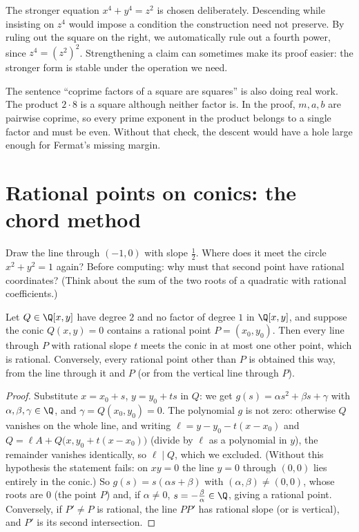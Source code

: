 The stronger equation $x^4+y^4=z^2$ is chosen deliberately. Descending while insisting on $z^4$ would impose a condition the construction need not preserve. By ruling out the square on the right, we automatically rule out a fourth power, since $z^4=(z^2)^2$. Strengthening a claim can sometimes make its proof easier: the stronger form is stable under the operation we need.

The sentence ``coprime factors of a square are squares'' is also doing real work. The product $2\cdot8$ is a square although neither factor is. In the proof, $m,a,b$ are pairwise coprime, so every prime exponent in the product belongs to a single factor and must be even. Without that check, the descent would have a hole large enough for Fermat's missing margin.

\section{Rational points on conics: the chord method}

\begin{think}
Draw the line through $(-1,0)$ with slope $\frac12$. Where does it meet the circle $x^2+y^2=1$ again? Before computing: why must that second point have rational coordinates? (Think about the sum of the two roots of a quadratic with rational coefficients.)
\end{think}

\begin{proposition}\label{prop:chord}
Let $Q\in\Q[x,y]$ have degree $2$ and no factor of degree $1$ in $\Q[x,y]$, and suppose the conic $Q(x,y)=0$ contains a rational point $P=(x_0,y_0)$. Then every line through $P$ with rational slope $t$ meets the conic in at most one other point, which is rational. Conversely, every rational point other than $P$ is obtained this way, from the line through it and $P$ (or from the vertical line through $P$).
\end{proposition}
\begin{proof}
Substitute $x=x_0+s$, $y=y_0+ts$ in $Q$: we get $g(s)=\alpha s^2+\beta s+\gamma$ with $\alpha,\beta,\gamma\in\Q$, and $\gamma=Q(x_0,y_0)=0$. The polynomial $g$ is not zero: otherwise $Q$ vanishes on the whole line, and writing $\ell=y-y_0-t(x-x_0)$ and $Q=\ell A+Q\big(x,y_0+t(x-x_0)\big)$ (divide by $\ell$ as a polynomial in $y$), the remainder vanishes identically, so $\ell\mid Q$, which we excluded. (Without this hypothesis the statement fails: on $xy=0$ the line $y=0$ through $(0,0)$ lies entirely in the conic.) So $g(s)=s(\alpha s+\beta)$ with $(\alpha,\beta)\ne(0,0)$, whose roots are $0$ (the point $P$) and, if $\alpha\ne0$, $s=-\frac\beta\alpha\in\Q$, giving a rational point. Conversely, if $P'\ne P$ is rational, the line $PP'$ has rational slope (or is vertical), and $P'$ is its second intersection.
\end{proof}

